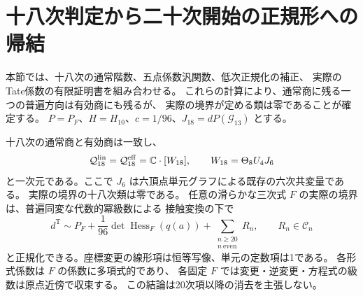 


\section{十八次判定から二十次開始の正規形への帰結}
\label{sec:v14-twentieth}

本節では、十八次の通常階数、五点係数汎関数、低次正規化の補正、
実際のTate係数の有限証明書を組み合わせる。
これらの計算により、通常商に残る一つの普遍方向は有効商にも残るが、
実際の境界が定める類は零であることが確定する。
$P=P_F$、$H=H_{10}$、$c=1/96$、$J_{18}=dP(\mathcal G_{13})$ とする。

\begin{theorem}[十八次の消去と二十次開始の代数的収束偶正規形]
\label{thm:v14-twentieth-normal-form}
十八次の通常商と有効商は一致し、
\[
 \mathcal Q^{\mathrm{lin}}_{18}
 =\mathcal Q^{\mathrm{eff}}_{18}
 =\mathbb C\cdot[W_{18}],\qquad
 W_{18}=\Theta_8U_4J_6
\]
と一次元である。ここで $J_6$ は六頂点単元グラフによる既存の六次共変量である。
実際の境界の十八次類は零である。
任意の滑らかな三次式 $F$ の実際の境界は、普遍同変な代数的冪級数による
接触変換の下で
\begin{equation}\label{eq:v14-twentieth-normal-form}
 \boxed{\displaystyle
 d^{\mathrm T}\sim P_F+\frac1{96}\det\operatorname{Hess}_F(q(a))
       +\sum_{\substack{n\ge20\\n\ \mathrm{even}}}R_n,
 \qquad R_n\in\mathcal C_n
 }
\end{equation}
と正規化できる。座標変更の線形項は恒等写像、単元の定数項は1である。
各形式係数は $F$ の係数に多項式的であり、
各固定 $F$ では変更・逆変更・方程式の級数は原点近傍で収束する。
この結論は20次項以降の消去を主張しない。
\end{theorem}

